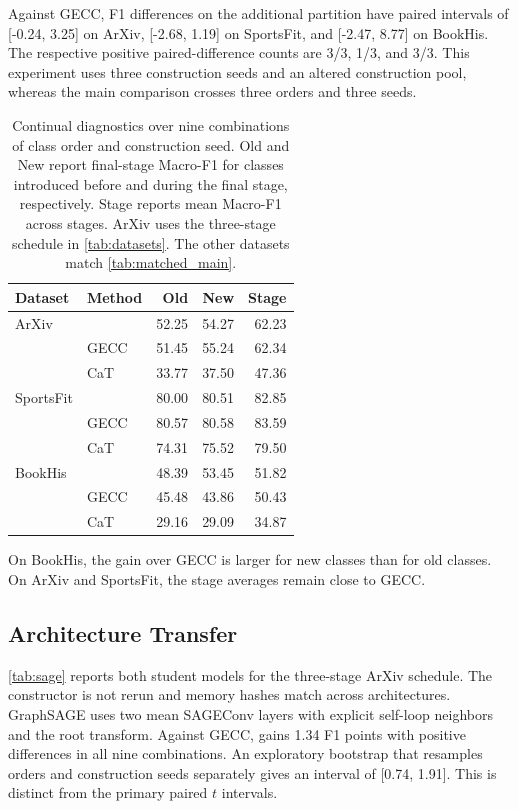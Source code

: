 Against GECC, F1 differences on the additional partition have paired intervals
of [-0.24, 3.25] on ArXiv, [-2.68, 1.19] on SportsFit, and
[-2.47, 8.77] on BookHis. The respective positive paired-difference counts are
3/3, 1/3, and 3/3.
This experiment uses three construction seeds and an altered construction
pool, whereas the main comparison crosses three orders and three seeds.

\begin{table}[H]
\centering
\footnotesize
\setlength{\tabcolsep}{3pt}
\caption{Continual diagnostics over nine combinations of class order and construction seed.
Old and New report final-stage Macro-F1 for classes introduced before and
during the final stage, respectively. Stage reports mean Macro-F1 across
stages. ArXiv uses the three-stage schedule in \autoref{tab:datasets}. The
other datasets match \autoref{tab:matched_main}.}
\label{tab:continual_metrics}
\begin{tabular*}{\linewidth}{@{\extracolsep{\fill}}llrrr@{}}
\toprule
Dataset & Method & Old & New & Stage\\
\midrule
ArXiv & \method{} & 52.25 & 54.27 & 62.23\\
& GECC & 51.45 & 55.24 & 62.34\\
& CaT & 33.77 & 37.50 & 47.36\\
\midrule
SportsFit & \method{} & 80.00 & 80.51 & 82.85\\
& GECC & 80.57 & 80.58 & 83.59\\
& CaT & 74.31 & 75.52 & 79.50\\
\midrule
BookHis & \method{} & 48.39 & 53.45 & 51.82\\
& GECC & 45.48 & 43.86 & 50.43\\
& CaT & 29.16 & 29.09 & 34.87\\
\bottomrule
\end{tabular*}
\end{table}

On BookHis, the gain over GECC is larger for new classes than for old
classes. On ArXiv and SportsFit, the stage averages remain close to GECC.

\subsection{Architecture Transfer}

\autoref{tab:sage} reports both student models for the three-stage ArXiv
schedule. The constructor is not rerun and memory hashes match across
architectures. GraphSAGE uses two mean SAGEConv layers with explicit
self-loop neighbors and the root transform. Against GECC, \method{} gains
1.34 F1 points with positive differences in all nine combinations. An exploratory
bootstrap that resamples orders and construction seeds separately gives an
interval of [0.74, 1.91]. This is distinct from the
primary paired \(t\) intervals.

